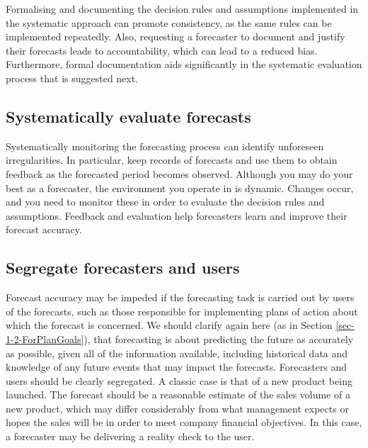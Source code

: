 \documentclass[]{book}
\begin{document}
Formalising and documenting the decision rules and assumptions implemented in the systematic approach can promote consistency, as the same rules can be implemented repeatedly. Also, requesting a forecaster to document and justify their forecasts leads to accountability, which can lead to a reduced bias. Furthermore, formal documentation aids significantly in the systematic evaluation process that is suggested next.

\hypertarget{systematically-evaluate-forecasts}{%
\subsection*{Systematically evaluate forecasts}\label{systematically-evaluate-forecasts}}

Systematically monitoring the forecasting process can identify unforeseen irregularities. In particular, keep records of forecasts and use them to obtain feedback as the forecasted period becomes observed. Although you may do your best as a forecaster, the environment you operate in is dynamic. Changes occur, and you need to monitor these in order to evaluate the decision rules and assumptions. Feedback and evaluation help forecasters learn and improve their forecast accuracy.

\hypertarget{segregate-forecasters-and-users}{%
\subsection*{Segregate forecasters and users}\label{segregate-forecasters-and-users}}

Forecast accuracy may be impeded if the forecasting task is carried out by users of the forecasts, such as those responsible for implementing plans of action about which the forecast is concerned. We should clarify again here (as in Section \ref{sec-1-2-ForPlanGoals}), that forecasting is about predicting the future as accurately as possible, given all of the information available, including historical data and knowledge of any future events that may impact the forecasts. Forecasters and users should be clearly segregated. A classic case is that of a new product being launched. The forecast should be a reasonable estimate of the sales volume of a new product, which may differ considerably from what management expects or hopes the sales will be in order to meet company financial objectives. In this case, a forecaster may be delivering a reality check to the user.
\end{document}
